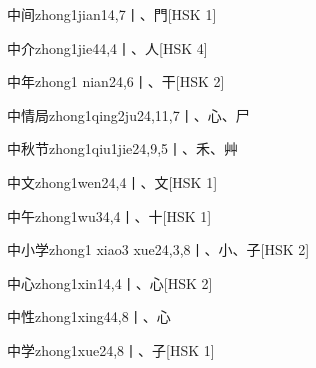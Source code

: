 \begin{entry}{中间}{zhong1jian1}{4,7}{⼁、⾨}[HSK 1]
\end{entry}

\begin{entry}{中介}{zhong1jie4}{4,4}{⼁、⼈}[HSK 4]
\end{entry}

\begin{entry}{中年}{zhong1 nian2}{4,6}{⼁、⼲}[HSK 2]
\end{entry}

\begin{entry}{中情局}{zhong1qing2ju2}{4,11,7}{⼁、⼼、⼫}
\end{entry}

\begin{entry}{中秋节}{zhong1qiu1jie2}{4,9,5}{⼁、⽲、⾋}
\end{entry}

\begin{entry}{中文}{zhong1wen2}{4,4}{⼁、⽂}[HSK 1]
\end{entry}

\begin{entry}{中午}{zhong1wu3}{4,4}{⼁、⼗}[HSK 1]
\end{entry}

\begin{entry}{中小学}{zhong1 xiao3 xue2}{4,3,8}{⼁、⼩、⼦}[HSK 2]
\end{entry}

\begin{entry}{中心}{zhong1xin1}{4,4}{⼁、⼼}[HSK 2]
\end{entry}

\begin{entry}{中性}{zhong1xing4}{4,8}{⼁、⼼}
\end{entry}

\begin{entry}{中学}{zhong1xue2}{4,8}{⼁、⼦}[HSK 1]
\end{entry}

